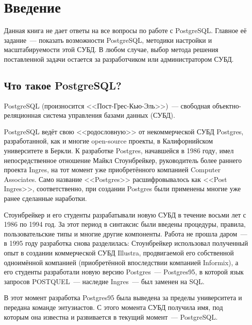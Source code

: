 \chapter{Введение}

\begin{epigraphs}
\end{epigraphs}

Данная книга не дает ответы на все вопросы по работе с PostgreSQL. Главное её задание~--- показать возможности PostgreSQL, методики настройки и масштабируемости этой СУБД. В любом случае, выбор метода решения поставленной задачи остается за разработчиком или администратором СУБД.


\section{Что такое PostgreSQL?}

PostgreSQL (произносится <<Пост-Грес-Кью-Эль>>)~--- свободная объектно-реляционная система управления базами данных (СУБД).

PostgreSQL ведёт свою <<родословную>> от некоммерческой СУБД Postgres, разработанной, как и многие open-source проекты, в Калифорнийском университете в Беркли. К разработке Postgres, начавшейся в 1986 году, имел непосредственное отношение Майкл Стоунбрейкер, руководитель более раннего проекта Ingres, на тот момент уже приобретённого компанией Computer Associates. Само название <<Postgres>> расшифровывалось как <<Post Ingres>>, соответственно, при создании Postgres были применены многие уже ранее сделанные наработки.

Стоунбрейкер и его студенты разрабатывали новую СУБД в течение восьми лет с 1986 по 1994 год. За этот период в синтаксис были введены процедуры, правила, пользовательские типы и многие другие компоненты. Работа не прошла даром~--- в 1995 году разработка снова разделилась: Стоунбрейкер использовал полученный опыт в создании коммерческой СУБД Illustra, продвигаемой его собственной одноимённой компанией (приобретённой впоследствии компанией Informix), а его студенты разработали новую версию Postgres~--- Postgres95, в которой язык запросов POSTQUEL~--- наследие Ingres~--- был заменен на SQL.

В этот момент разработка Postgres95 была выведена за пределы университета и передана команде энтузиастов. С этого момента СУБД получила имя, под которым она известна и развивается в текущий момент~--- PostgreSQL.

